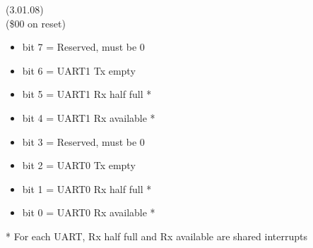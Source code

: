 (3.01.08)\\
(\$00 on reset)
\begin{itemize}
\item bit 7 = Reserved, must be 0
\item bit 6 = UART1 Tx empty
\item bit 5 = UART1 Rx half full *
\item bit 4 = UART1 Rx available *
\item bit 3 = Reserved, must be 0
\item bit 2 = UART0 Tx empty
\item bit 1 = UART0 Rx half full *
\item bit 0 = UART0 Rx available *
\end{itemize}
* For each UART, Rx half full and Rx available are shared interrupts
